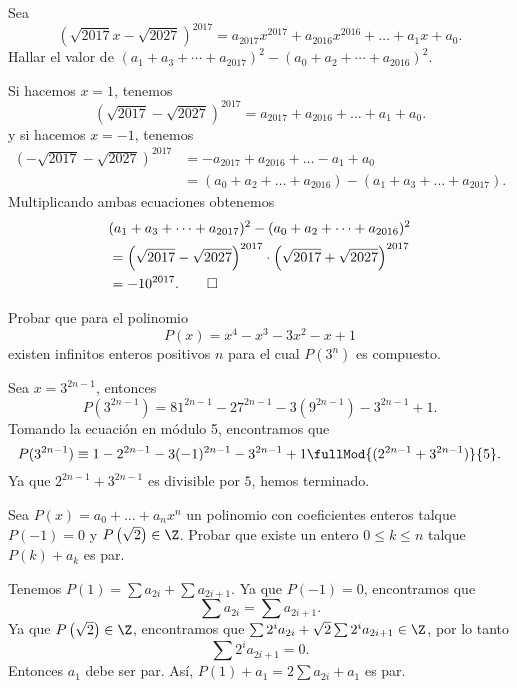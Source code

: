 \begin{example}
    Sea
    \[
        \left(\sqrt {2017} x - \sqrt {2027}\right)^{2017} = a_{2017} x^{2017} + a_{2016} x^{2016} + \ldots + a_1 x + a_0.
    \]
    Hallar el valor de $(a_1 + a_3 + \cdots + a_{2017})^2 - (a_0 + a_2 + \cdots + a_{2016})^2.$
\end{example}
\begin{solution}
    Si hacemos $x = 1$, tenemos
    \[
        \left(\sqrt {2017} - \sqrt {2027}\right)^{2017} = a_{2017} + a_{2016} + \ldots + a_1 + a_0.
    \]
    y si hacemos $x = -1$, tenemos
    \begin{align*}
        \left(-\sqrt {2017} - \sqrt {2027}\right)^{2017} &= -a_{2017} + a_{2016} + \ldots - a_1 + a_0\\
        &= (a_0 + a_2 + \ldots + a_{2016}) - (a_1 + a_3 + \ldots + a_{2017}).
    \end{align*}
    Multiplicando ambas ecuaciones obtenemos
    \begin{align*}
    &(a_1 + a_3 + \cdots + a_{2017})^2 - (a_0 + a_2 + \cdots + a_{2016})^2\\
    &= \left(\sqrt {2017} - \sqrt {2027}\right)^{2017} \cdot \left(\sqrt {2017} + \sqrt {2027}\right)^{2017}\\
    &= -10^{2017}. \qedhere
    \end{align*}
\end{solution}

\begin{example}
    Probar que para el polinomio
    \[
        P(x) = x^4 - x^3 - 3x^2 - x + 1
    \]
    existen infinitos enteros positivos $n$ para el cual $P(3^n)$ es compuesto.
\end{example}
\begin{solution}
    Sea $x = 3^{2n - 1}$, entonces
    \[
        P(3^{2n - 1}) = 81^{2n - 1} - 27^{2n - 1} - 3 (9^{2n - 1}) - 3^{2n - 1} + 1.
    \]
    Tomando la ecuación en módulo 5, encontramos que
    \[
        P(3^{2n - 1}) \equiv 1 - 2^{2n - 1} - 3(- 1)^{2n - 1} - 3^{2n - 1} + 1 \fullMod{(2^{2n - 1} + 3^{2n - 1})}{5}.
    \]
    Ya que $2^{2n - 1} + 3^{2n - 1}$ es divisible por $5$, hemos terminado.
\end{solution}

\begin{example}
    Sea $P(x) = a_0 + \ldots + a_n x^n$ un polinomio con coeficientes enteros talque $P(-1) = 0$ y $P\left(\sqrt {2}\right) \in \Z$.
    Probar que existe un entero $0 \leq k \leq n$ talque $P(k) + a_k$ es par.
\end{example}
\begin{solution}
    Tenemos $P(1) = \sum a_{2i} + \sum a_{2i + 1}.$
    Ya que $P(-1) = 0$, encontramos que
    \[
        \sum a_{2i} = \sum a_{2i + 1}.
    \]
    Ya que $P\left(\sqrt {2}\right) \in \Z$, encontramos que $\sum 2^i a_{2i} + \sqrt {2} \sum 2^i a_{2i + 1} \in \Z$, por lo tanto
    \[
        \sum 2^i a_{2i + 1} = 0.
    \]
    Entonces $a_1$ debe ser par.
    Así, $P(1) + a_1 = 2 \sum a_{2i} + a_1$ es par.
\end{solution}


